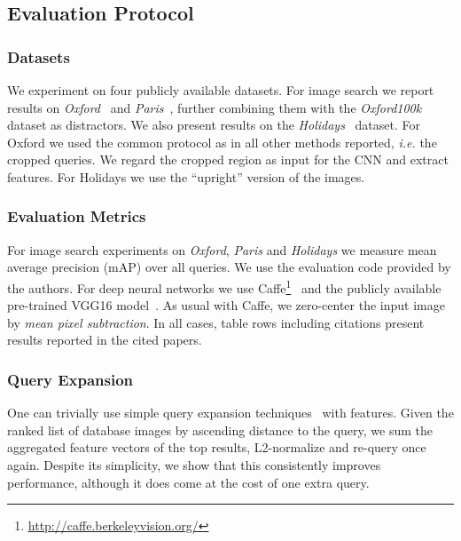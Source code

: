 \documentclass[runningheads]{llncs}
\begin{document}
\noindent


\subsection{Evaluation Protocol}
\label{subsec:eval}

\subsubsection{Datasets}

We experiment on four publicly available datasets. For image search we report results on \emph{Oxford}~\cite{PCI+07} and \emph{Paris}~\cite{PCS+08}, further combining them with the \emph{Oxford100k}~\cite{PCI+07} dataset as distractors. We also present results on the \emph{Holidays}~\cite{JeDS08} dataset.
For Oxford we used the common protocol as in all other methods reported, \emph{i.e.} the cropped queries. We regard the cropped region as input for the CNN and extract features. For Holidays we use the ``upright'' version of the images.


\subsubsection{Evaluation Metrics}

For image search experiments on \emph{Oxford}, \emph{Paris} and \emph{Holidays} we measure mean average precision (mAP) over all queries. We use the evaluation code provided by the authors.
For deep neural networks we use Caffe\footnote{\url{http://caffe.berkeleyvision.org/}}~\cite{YSD+14} and the publicly available pre-trained VGG16 model~\cite{SiZi14}. As usual with Caffe, we zero-center the input image by \textit{mean pixel subtraction}.
In all cases, table rows including citations present results reported in the cited papers.

\subsubsection{Query Expansion}

One can trivially use simple query expansion techniques~\cite{CPS+07} with \Crow features. Given the ranked list of database images by ascending distance to the query, we sum the aggregated feature vectors of the top  results, L2-normalize and re-query once again. Despite its simplicity, we show that this consistently improves performance, although it does come at the cost of one extra query.
%
 
\end{document}

